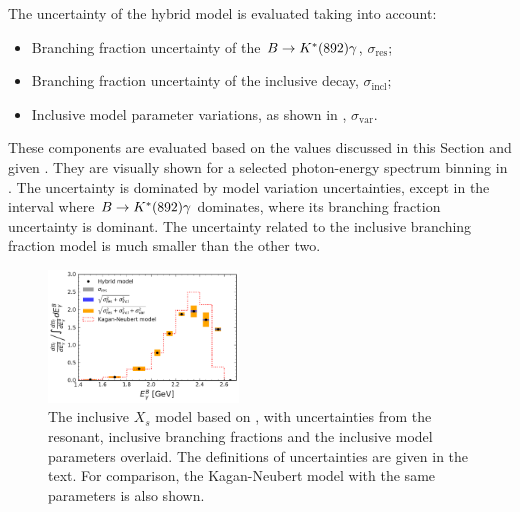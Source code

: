 The uncertainty of the hybrid model is evaluated taking into account:
\begin{itemize}
    \item Branching fraction uncertainty of the $B\rightarrow K^*(892)\gamma$, $\sigma_{\mathrm{res}}$;
    \item Branching fraction uncertainty of the inclusive \BtoXsgamma decay, $\sigma_{\mathrm{incl}}$;
    \item Inclusive model parameter variations, as shown in , $\sigma_{\mathrm{var}}$.
\end{itemize}
These components are evaluated based on the values discussed in this Section and given .
They are visually shown for a selected \BtoXsgamma photon-energy spectrum binning in .
The uncertainty is dominated by \BtoXsgamma model variation uncertainties, except in the interval where $B\rightarrow K^*(892)\gamma$ dominates, where its branching fraction uncertainty is dominant.
The uncertainty related to the \BtoXsgamma inclusive branching fraction model is much smaller than the other two.
\begin{figure}[htbp!]
    \centering
    \includegraphics[width=0.45\textwidth]{figures/data_samples/hybrid_model_uncertainties.pdf}
    \caption{\label{fig:hybrid_uncertainty}The inclusive $X_s$ model based on ,
    with uncertainties from the resonant, inclusive branching fractions and the inclusive model parameters overlaid.
    The definitions of uncertainties are given in the text.
    For comparison, the Kagan-Neubert model with the same parameters is also shown.
    }
\end{figure}


